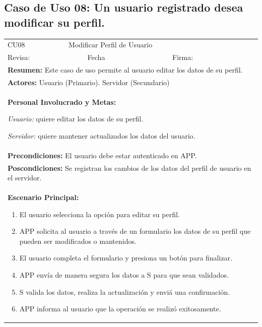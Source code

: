 		\subsection{Caso de Uso 08: Un usuario registrado desea modificar su perfil.}
			\begin{longtable}{|l|p{5.5cm}|l|p{2cm}|l|p{1.9cm}|} \hline
				\cellcolor{grisOscuro} CU08 & \multicolumn{4}{|l|}{  \cellcolor{grisOscuro} Modificar Perfil de Usuario} &  \cellcolor{grisClaro}\multirow{2}{1cm}{} \\ \cline{1-5}
				\cellcolor{grisOscuro} Revisa: &  \cellcolor{grisClaro} &  \cellcolor{grisOscuro} Fecha &  \cellcolor{grisClaro} &  \cellcolor{grisOscuro} Firma: & \cellcolor{grisClaro} \\ \hline
				\multicolumn{6}{|p{15cm}|}{ \textbf{Resumen: } Este caso de uso permite al usuario editar los datos de su perfil.

				} \\ \hline

				\multicolumn{6}{|p{15cm}|}{ \textbf{Actores: } Usuario (Primario). Servidor (Secundario)

				} \\ \hline

				\multicolumn{6}{|p{15cm}|}{ \textbf{Personal Involucrado y Metas: }
				
				\emph{Usuario:} quiere editar los datos de su perfil.

				\emph{Servidor:} quiere mantener actualizados los datos del usuario.

				} \\ \hline

				\multicolumn{6}{|p{15cm}|}{ \textbf{Precondiciones: } El usuario debe estar autenticado en APP.

				} \\ \hline

				\multicolumn{6}{|p{15cm}|}{ \textbf{Poscondiciones: } Se registran los cambios de los datos del perfil de usuario en el servidor.

				} \\ \hline

				\multicolumn{6}{|p{15cm}|}{ \textbf{Escenario Principal: }

				\begin{enumerate}
					\item El usuario selecciona la opción para editar su perfil.
					\item APP solicita al usuario a través de un formulario los datos de su perfil que pueden ser modificados o mantenidos.
					\item El usuario completa el formulario y presiona un botón para finalizar.
					\item APP envía de manera segura los datos a S para que sean validados.
					\item S valida los datos, realiza la actualización y enviá una confirmación.
					\item APP informa al usuario que la operación se realizó exitosamente.
				\end{enumerate}

}
\end{longtable}
